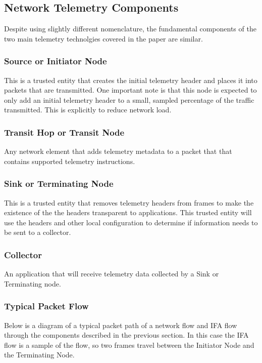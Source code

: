 \documentclass[letterpaper,twocolumn,10pt]{article}
\begin{document}
\subsection{Network Telemetry Components}

Despite using slightly different nomenclature, the fundamental
components of the two main telemetry technolgies covered in the paper
are similar.

\subsubsection{Source or Initiator Node}
This is a trusted entity that creates the initial telemetry header and
places it into packets that are transmitted.  One important note is that
this node is expected to only add an initial telemetry header to a
small, sampled percentage of the traffic transmitted.  This is
explicitly to reduce network load.

\subsubsection{Transit Hop or Transit Node}
Any network element that adds telemetry metadata to a packet that
that contains supported telemetry instructions.

\subsubsection{Sink or Terminating Node}
This is a trusted entity that removes telemetry headers from frames to
make the existence of the the headers transparent to applications.  This
trusted entity will use the headers and other local configuration to
determine if information needs to be sent to a collector.

\subsubsection{Collector}
An application that will receive telemetry data collected by a Sink or
Terminating node.

\subsubsection{Typical Packet Flow}

Below is a diagram of a typical packet path of a network flow and IFA
flow through the components described in the previous section.  In this
case the IFA flow is a sample of the flow, so two frames travel between
the Initiator Node and the Terminating Node.
\end{document}
